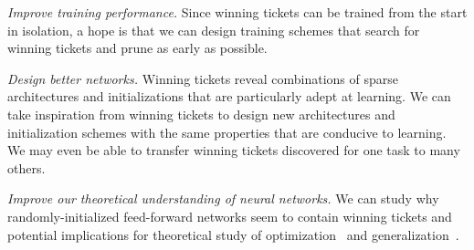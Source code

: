\textit{Improve training performance.}  Since winning tickets can be trained from the start in isolation, a hope is that we can design training schemes that search for winning tickets and prune as early as possible.

\textit{Design better networks.} Winning tickets reveal combinations of sparse architectures and initializations that are particularly adept at learning. We can take
inspiration from winning tickets to design new architectures and initialization schemes with the same properties that are conducive to learning. We may even be able to transfer
winning tickets discovered for one task to many others.

\textit{Improve our theoretical understanding of neural networks.} We can study why randomly-initialized feed-forward
networks seem to contain winning tickets and potential implications for theoretical study of
optimization~\citep{provably} and generalization~\citep{comp, arora}.